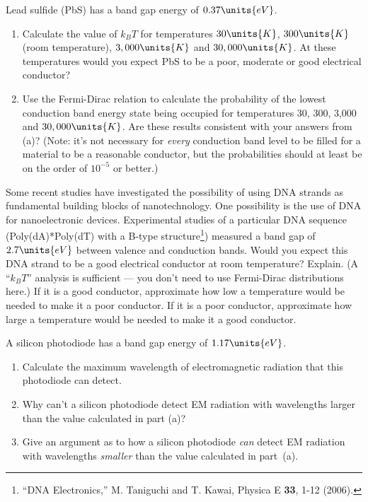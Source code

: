
\begin{problem}
Lead sulfide (PbS) has a band gap energy of $0.37\units{eV}$.
\begin{enumerate}
\item Calculate the value of $k_BT$ for temperatures $30\units{K}$,
$300\units{K}$ (room temperature), $3,000\units{K}$ and $30,000\units{K}$. 
At these temperatures would you expect PbS to be a poor, moderate or 
good electrical conductor?
\item Use the Fermi-Dirac relation to calculate the probability of the
lowest conduction band energy state being occupied for temperatures
30, 300, 3,000 and $30,000\units{K}$.  Are these results consistent with your
answers from (a)? (Note: it's not necessary for {\it every} conduction
band level to be filled for a material to be a reasonable conductor,
but the probabilities should at least be on the order of $10^{-5}$
or better.)
\end{enumerate}
\end{problem}


\begin{problem}
Some recent studies have investigated the possibility of using DNA
strands as fundamental building blocks of nanotechnology. One
possibility is the use of DNA for nanoelectronic devices.
Experimental studies of a particular DNA sequence
(Poly(dA)*Poly(dT) with a B-type structure\footnote{``DNA
Electronics,'' M. Taniguchi and T. Kawai, Physica E {\bf 33},
1-12 (2006).}) measured a band gap of $2.7\units{eV}$ between
valence and conduction bands. Would you expect
this DNA strand to be a good electrical conductor at room 
temperature? Explain. (A ``$k_BT$'' analysis is sufficient ---
you don't need to use Fermi-Dirac distributions here.) If it is
a good conductor, approximate how low a temperature would be
needed to make it a poor conductor. If it is a poor conductor,
approximate how large a temperature would be needed to make it
a good conductor.
\end{problem}


\begin{problem}
A silicon photodiode has a band gap energy of $1.17\units{eV}$. 
\begin{enumerate}
\item Calculate
the maximum wavelength of electromagnetic radiation that this photodiode
can detect. 
\item Why can't a silicon photodiode detect EM radiation
with wavelengths larger than the value calculated in part (a)?
\item Give an argument as to how a silicon photodiode {\it can}
detect EM radiation with wavelengths {\it smaller} than the value
calculated in part~(a).
\end{enumerate}
\end{problem}

